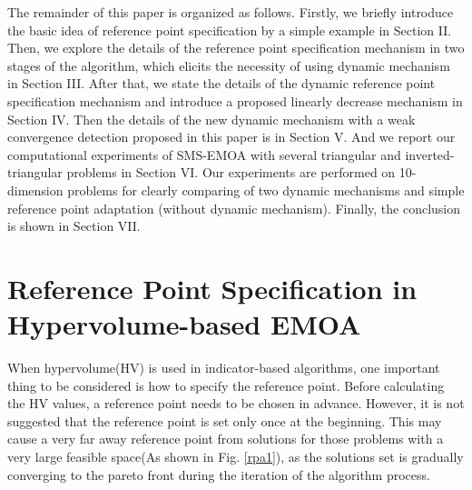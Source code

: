 \documentclass[conference]{IEEEtran}
\begin{document}
The remainder of this paper is organized as follows. 
Firstly, we briefly introduce the basic idea of reference point specification by a simple example in Section II. 
Then, we explore the details of the reference point specification mechanism in two stages of the algorithm, 
which elicits the necessity of using dynamic mechanism in Section III.
After that, we state the details of the dynamic reference point specification mechanism and introduce 
a proposed linearly decrease mechanism in Section IV. 
Then the details of the new dynamic mechanism with a weak convergence detection proposed in this paper is in Section V. 
And we report our computational experiments of SMS-EMOA 
with several triangular and inverted-triangular problems in Section VI. Our experiments are performed on
10-dimension problems for clearly comparing of two dynamic mechanisms and 
simple reference point adaptation (without dynamic mechanism). Finally, the conclusion is shown in Section VII.

%
%
\section{Reference Point Specification in Hypervolume-based EMOA}
When hypervolume(HV) is used in indicator-based algorithms, 
one important thing to be considered is how to specify the reference point.
Before calculating the HV values, a reference point needs to be chosen in advance.
However, it is not suggested that the reference point is set only once at the beginning. 
This may cause a very far away reference point from solutions
for those problems with a very large feasible space(As shown in Fig. \ref{rpa1}),
as the solutions set is gradually converging to the pareto front
during the iteration of the algorithm process.
\end{document}
